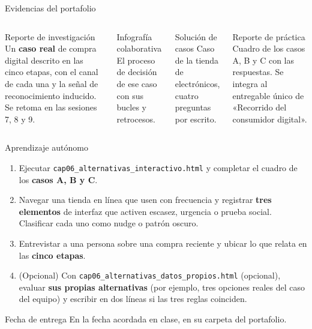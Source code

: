 \documentclass[aspectratio=169,xcolor=dvipsnames]{beamer}
\begin{document}
\begin{frame}{Evidencias del portafolio}
\small
\begin{columns}[T]
  \begin{block}{Reporte de investigación}
    \scriptsize Un \textbf{caso real} de compra digital descrito en las cinco etapas, con el canal de cada una y la señal de reconocimiento inducido. Se retoma en las sesiones 7, 8 y 9.
  \end{block}
  \begin{block}{Infografía colaborativa}
    \scriptsize El proceso de decisión de ese caso con sus bucles y retrocesos.
  \end{block}
  \begin{block}{Solución de casos}
    \scriptsize Caso de la tienda de electrónicos, cuatro preguntas por escrito.
  \end{block}
  \begin{block}{Reporte de práctica}
    \scriptsize Cuadro de los casos A, B y C con las respuestas. Se integra al entregable único de «Recorrido del consumidor digital».
  \end{block}
\end{columns}
\end{frame}

\begin{frame}{Aprendizaje autónomo}
\footnotesize
\begin{enumerate}
  \item Ejecutar \texttt{cap06\_alternativas\_\allowbreak interactivo.html} y completar el cuadro de los \textbf{casos A, B y C}.
  \vspace{1pt}
  \item Navegar una tienda en línea que usen con frecuencia y registrar \textbf{tres elementos} de interfaz que activen escasez, urgencia o prueba social. Clasificar cada uno como nudge o patrón oscuro.
  \vspace{1pt}
  \item Entrevistar a una persona sobre una compra reciente y ubicar lo que relata en las \textbf{cinco etapas}.
  \vspace{1pt}
  \item (Opcional) Con \texttt{cap06\_alternativas\_datos\_propios.html} (opcional), evaluar \textbf{sus propias alternativas} (por ejemplo, tres opciones reales del caso del equipo) y escribir en dos líneas si las tres reglas coinciden.
\end{enumerate}
\vspace{2pt}
\begin{alertblock}{Fecha de entrega}
  En la fecha acordada en clase, en su carpeta del portafolio.
\end{alertblock}
\end{frame}
\end{document}
